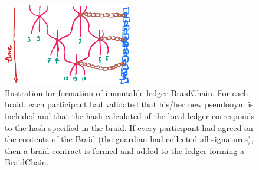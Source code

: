 \documentclass[12pt,a4paper]{article}
\let\oldincludegraphics\includegraphics
\renewcommand{\includegraphics}[1]{\oldincludegraphics[width=0.5\textwidth]{#1}}
\begin{document}
\begin{figure}
\centering
\includegraphics{figures/braidchain}
\caption{Ilustration for formation of immutable ledger BraidChain. For each braid, each participant had validated that his/her new pseudonym is included and that the hash calculated of the local ledger corresponds to the hash specified in the braid. If every participant had agreed on the contents of the Braid (the guardian had collected all signatures), then a braid contract is formed and added to the ledger forming a BraidChain.}
\end{figure}
\par
\end{document}
